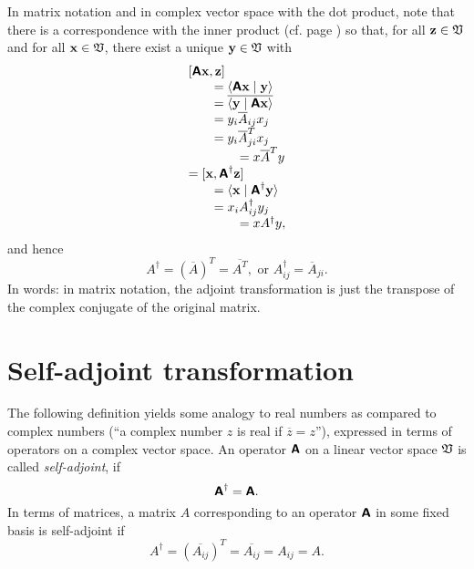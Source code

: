 In matrix notation and in complex vector space with the dot product,
note that there is a correspondence with the inner product
(cf. page \pageref{2011-m-corr-bil-ip})
so that, for all ${\bf z}\in {\frak V}$ and for all ${\bf x}\in {\frak V}$,
 there exist a unique ${\bf y}\in {\frak V}$ with
\begin{equation}
\begin{array}{l}
[\textsf{\textbf{A}}{\bf x}, {\bf z}]\\
\qquad =\langle \textsf{\textbf{A}} {\bf x}\mid {\bf y}\rangle  \\
\qquad =\overline{ \langle{\bf y}\mid \textsf{\textbf{A}} {\bf x}\rangle } \\
\qquad = y_i\overline{ A}_{ij} x_j  \\
\qquad = y_i\overline{ A}_{ji}^T x_j  \\
\qquad \qquad  = x\overline{ A}^T y\\
=
[{\bf x}, \textsf{\textbf{A}}^\dagger {\bf z}]\\
\qquad =
\langle {\bf x}\mid \textsf{\textbf{A}}^\dagger {\bf y}\rangle        \\
\qquad = x_i A_{ij}^\dagger y_j   \\
\qquad \qquad   =   x A ^\dagger y,
\end{array}
\end{equation}
and hence
\begin{equation}
A ^\dagger =(\overline{ A})^T =\overline{ A^T}, \textrm{ or } A^\dagger_{ij}=\overline{A}_{ji} .
\end{equation}
In words: in matrix notation, the adjoint transformation is just the
transpose of the complex conjugate of the original matrix.

\section{Self-adjoint transformation}



The following definition yields some analogy to real numbers as compared to complex numbers
(``a complex number $z$ is real if $\overline{z}=z$''),
expressed in terms of operators on a complex vector space.
An operator    $\textsf{\textbf{A}}$   on a linear vector space   ${\frak V}$
is called {\em self-adjoint}, if
\begin{equation}
\textsf{\textbf{A}}^{\dagger}=
\textsf{\textbf{A}}.
\end{equation}
In terms of matrices, a matrix $A$ corresponding to an operator $\textsf{\textbf{A}}$ in
some fixed basis is self-adjoint
if
\begin{equation}
A^{\dagger}= (\overline{A_{ij}})^T=  \overline{A_{ij}} =A_{ij}=A.
\end{equation}

